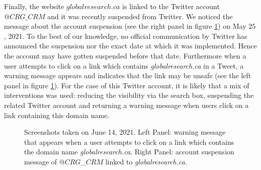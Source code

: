\documentclass{article}
\begin{document}
Finally, the website $globalresearch.ca$ is linked to the Twitter account {$@CRG\_CRM$} and it was recently suspended from Twitter. We noticed the message about the account suspension (see the right panel in figure \ref{fig4bis}) on May $25$, 2021. To the best of our knowledge, no official communication by Twitter has announced the suspension nor the exact date at which it was implemented. Hence the account may have gotten suspended before that date. Furthermore when a user attempts to click on a link which contains {\it globalresearch.ca} in a Tweet, a warning message appears and indicates that the link may be unsafe (see the left panel in figure \ref{fig4bis}). For the case of this Twitter account, it is likely that a mix of interventions was used: reducing the visibility via the search box, suspending the related Twitter account and returning a warning message when users click on a link containing this domain name.  


\begin{figure}[h]
	\begin{center}
	\end{center}
	\caption{Screenshots taken on June 14, 2021. Left Panel: warning message that appears when a user attempts to click on a link which contains the domain name {\it globalresearch.ca}. Right Panel: account suspension message of $@CRG$\_$CRM$ linked to {\it globalresearch.ca}.  }
	\label{fig4bis}
\end{figure}

\end{document}
